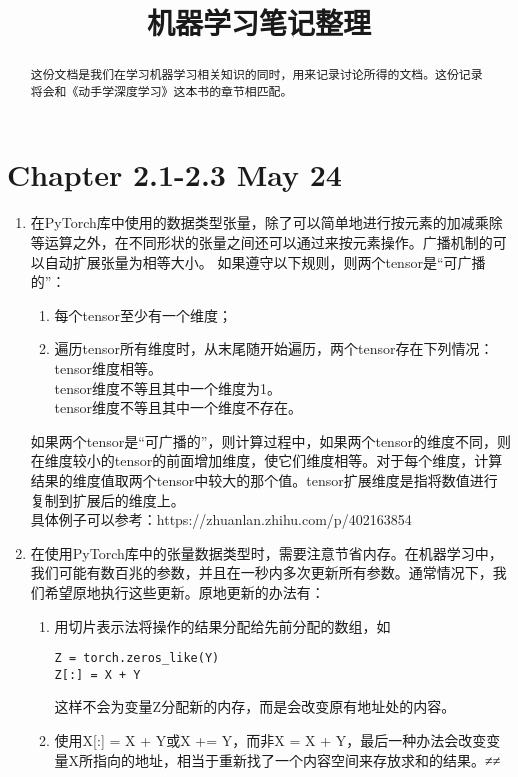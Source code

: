 \documentclass[a4paper]{article}
\title{ 机器学习笔记整理}
\begin{document}
\maketitle
\begin{abstract}
	这份文档是我们在学习机器学习相关知识的同时，用来记录讨论所得的文档。这份记录将会和《动手学深度学习》这本书的章节相匹配。
\end{abstract}
\section{Chapter 2.1-2.3 May 24}
\begin{enumerate}
	\item 在PyTorch库中使用的数据类型张量，除了可以简单地进行按元素的加减乘除等运算之外，在不同形状的张量之间还可以通过来按元素操作。广播机制的可以自动扩展张量为相等大小。
	如果遵守以下规则，则两个tensor是“可广播的”：
\begin{enumerate}
    \item 每个tensor至少有一个维度；
    \item 遍历tensor所有维度时，从末尾随开始遍历，两个tensor存在下列情况：
        \\tensor维度相等。
        \\tensor维度不等且其中一个维度为1。
        \\tensor维度不等且其中一个维度不存在。
\end{enumerate}
 如果两个tensor是“可广播的”，则计算过程中，如果两个tensor的维度不同，则在维度较小的tensor的前面增加维度，使它们维度相等。对于每个维度，计算结果的维度值取两个tensor中较大的那个值。tensor扩展维度是指将数值进行复制到扩展后的维度上。
\\具体例子可以参考：https://zhuanlan.zhihu.com/p/402163854

\item 在使用PyTorch库中的张量数据类型时，需要注意节省内存。在机器学习中，我们可能有数百兆的参数，并且在一秒内多次更新所有参数。通常情况下，我们希望原地执行这些更新。原地更新的办法有：
\begin{enumerate}
	\item 用切片表示法将操作的结果分配给先前分配的数组，如
	\begin{lstlisting}
Z = torch.zeros_like(Y)
Z[:] = X + Y
	\end{lstlisting}
	这样不会为变量Z分配新的内存，而是会改变原有地址处的内容。
	\item	使用X[:] = X + Y或X += Y，而非X = X + Y，最后一种办法会改变变量X所指向的地址，相当于重新找了一个内容空间来存放求和的结果。≠≠
\end{enumerate}

\end{enumerate}
\end{document}
